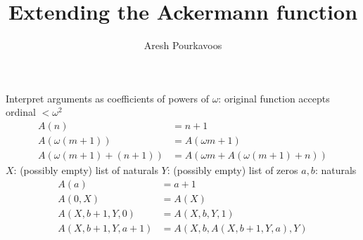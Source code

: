 \documentclass{article}
\begin{document}
\title{Extending the Ackermann function}
\author{Aresh Pourkavoos}
\maketitle

Interpret arguments as coefficients of powers of $\omega$:
original function accepts ordinal $<\omega^2$
\begin{align*}
  A(n) &= n+1 \\
  A(\omega(m+1)) &= A(\omega m+1) \\
  A(\omega(m+1)+(n+1)) &= A(\omega m+A(\omega(m+1)+n))
\end{align*}
$X$: (possibly empty) list of naturals
$Y$: (possibly empty) list of zeros
$a, b$: naturals
\begin{align*}
  A(a) &= a+1 \\
  A(0, X) &= A(X) \\
  A(X, b+1, Y, 0) &= A(X, b, Y, 1) \\
  A(X, b+1, Y, a+1) &= A(X, b, A(X, b+1, Y, a), Y) \\
\end{align*}
\end{document}
